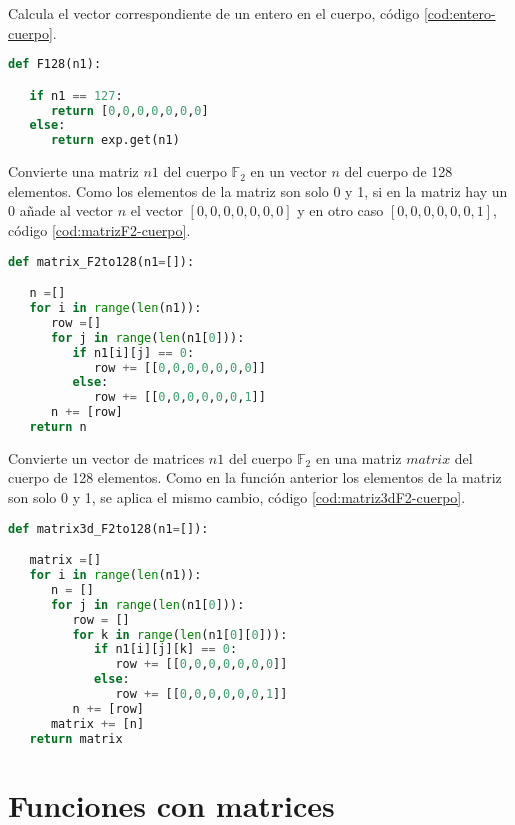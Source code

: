 Calcula el vector correspondiente de un entero en el cuerpo, código \ref{cod:entero-cuerpo}.\\

\begin{lstlisting}[language=Python,caption=Convierte un entero en un elemento del cuerpo, label=cod:entero-cuerpo]
def F128(n1):

   if n1 == 127:
      return [0,0,0,0,0,0,0]
   else:
      return exp.get(n1)
\end{lstlisting}


Convierte una matriz $n1$ del cuerpo $\mathds{F}_2$ en un vector $n$ del cuerpo de 128 elementos. Como los elementos de la matriz son solo 0 y 1, si en la matriz hay un 0 añade al vector $n$ el vector $[0,0,0,0,0,0,0]$ y en otro caso $[0,0,0,0,0,0,1]$, código \ref{cod:matrizF2-cuerpo}.\\

\begin{lstlisting}[language=Python,caption=Matriz de $\mathds{F}_2$ a un elemento del cuerpo 128 elementos, label=cod:matrizF2-cuerpo]
def matrix_F2to128(n1=[]):

   n =[]
   for i in range(len(n1)):
      row =[]
      for j in range(len(n1[0])):
         if n1[i][j] == 0:
            row += [[0,0,0,0,0,0,0]]
         else:
            row += [[0,0,0,0,0,0,1]]
      n += [row]
   return n
\end{lstlisting}


Convierte un vector de matrices $n1$ del cuerpo $\mathds{F}_2$ en una matriz $matrix$ del cuerpo de 128 elementos. Como en la función anterior los elementos de la matriz son solo 0 y 1, se aplica el mismo cambio, código \ref{cod:matriz3dF2-cuerpo}.\\

\begin{lstlisting}[language=Python,caption=Vector de matrices de $\mathds{F}_2$ a una matriz del cuerpo de 128 elementos, label=cod:matriz3dF2-cuerpo]
def matrix3d_F2to128(n1=[]):

   matrix =[]
   for i in range(len(n1)):
      n = []
      for j in range(len(n1[0])):
         row = []
         for k in range(len(n1[0][0])):
            if n1[i][j][k] == 0:
               row += [[0,0,0,0,0,0,0]]
            else:
               row += [[0,0,0,0,0,0,1]]
         n += [row]
      matrix += [n]
   return matrix
\end{lstlisting}

\section{Funciones con matrices}

